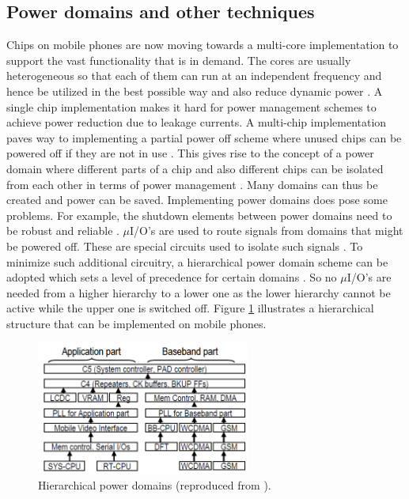\documentclass[journal]{IEEEtran}
\begin{document}
\subsection{Power domains and other techniques}
Chips on mobile phones are now moving towards a multi-core implementation to support the vast functionality that is in demand. The cores are usually heterogeneous so that each of them can run at an independent frequency and hence be utilized in the best possible way and also reduce dynamic power \cite{HierarchicalPower}. A single chip implementation makes it hard for power management schemes to achieve power reduction due to leakage currents. A multi-chip implementation paves way to implementing a partial power off scheme where unused chips can be powered off if they are not in use \cite{HierarchicalPower}. This gives rise to the concept of a power domain where different parts of a chip and also different chips can be isolated from each other in terms of power management \cite{HierarchicalPower}. Many domains can thus be created and power can be saved. Implementing power domains does pose some problems. For example, the shutdown elements between power domains need to be robust and reliable \cite{HierarchicalPower}. $\mu$I/O’s are used to route signals from domains that might be powered off. These are special circuits used to isolate such signals \cite{HierarchicalPower}. To minimize such additional circuitry, a hierarchical power domain scheme can be adopted which sets a level of precedence for certain domains \cite{HierarchicalPower}. So no $\mu$I/O’s are needed from a higher hierarchy to a lower one as the lower hierarchy cannot be active while the upper one is switched off. Figure \ref{Figure:Hier} illustrates a hierarchical structure that can be implemented on mobile phones.

	\begin{figure}[h]
	   \centering
	   \includegraphics[width = 7cm]{Hier}
	   \caption{Hierarchical power domains (reproduced from \cite{HierarchicalPower}).}
	   \label{Figure:Hier}
	\end{figure}	
	\FloatBarrier
\end{document}
